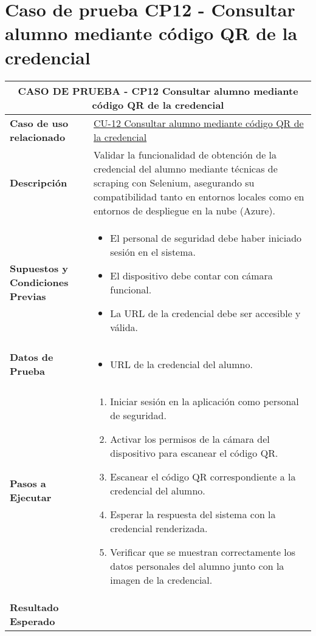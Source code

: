 
\section{Caso de prueba CP12 - Consultar alumno mediante código QR de la credencial}

\begin{longtable}{|p{5cm}|p{10cm}|}
	\hline
	\multicolumn{2}{|c|}{\textbf{CASO DE PRUEBA - CP12 Consultar alumno mediante código QR de la credencial}} \\
	\hline
	\textbf{Caso de uso relacionado} & \hyperref[CU-12]{CU-12 Consultar alumno mediante código QR de la credencial} \\
	\hline
	\textbf{Descripción} & Validar la funcionalidad de obtención de la credencial del alumno mediante técnicas de scraping con Selenium, asegurando su compatibilidad tanto en entornos locales como en entornos de despliegue en la nube (Azure). \\
	\hline
	\textbf{Supuestos y Condiciones Previas} & 
	\begin{itemize}
		\item El personal de seguridad debe haber iniciado sesión en el sistema.
		\item El dispositivo debe contar con cámara funcional.
		\item La URL de la credencial debe ser accesible y válida.
	\end{itemize} \\
	\hline
	\textbf{Datos de Prueba} & 
	\begin{itemize}
		\item URL de la credencial del alumno.
	\end{itemize} \\
	\hline
	\textbf{Pasos a Ejecutar} & 
	\begin{enumerate}
		\item Iniciar sesión en la aplicación como personal de seguridad.
		\item Activar los permisos de la cámara del dispositivo para escanear el código QR.
		\item Escanear el código QR correspondiente a la credencial del alumno.
		\item Esperar la respuesta del sistema con la credencial renderizada.
		\item Verificar que se muestran correctamente los datos personales del alumno junto con la imagen de la credencial.
	\end{enumerate} \\
	\hline
	\textbf{Resultado Esperado} & 

\end{longtable}
